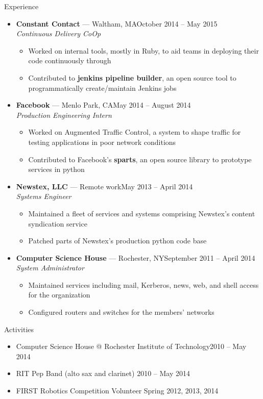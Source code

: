 \documentclass[10pt,oneside]{article}
\newenvironment{ressection}[1]{
	\vspace{3pt}
	{\fontfamily{ppl}\selectfont\Large#1}
	\begin{itemize}
	\vspace{2pt}
}{
	\end{itemize}
}
\newcommand{\resitem}[1]{
	\vspace{-2pt}
	\item \begin{flushleft} #1 \end{flushleft}
}
\newcommand{\ressubitem}[1]{
	\vspace{-1pt}
	\item \begin{flushleft} #1 \end{flushleft}
}
\newcommand{\resbigitem}[3]{
	\vspace{-3pt}
	\item
	\textbf{#1} --- #2 \\
	\textit{#3}
}
\newenvironment{ressubsec}[3]{
	\resbigitem{#1}{#2}{#3}
	\vspace{-1pt}
	\begin{itemize}
}{
	\end{itemize}
}
\begin{document}
\begin{ressection}{Experience}

	\begin{ressubsec}{Constant Contact}{Waltham, MA\hfill October 2014 -- May 2015}{Continuous Delivery CoOp}
		\ressubitem{Worked on internal tools, mostly in Ruby, to aid teams in deploying their code continuously through }
		\ressubitem{Contributed to \textbf{jenkins pipeline builder}, an open source tool to programmatically create/maintain Jenkins jobs}
	\end{ressubsec}
	\begin{ressubsec}{Facebook}{Menlo Park, CA\hfill May 2014 -- August 2014}{Production Engineering Intern}
		\ressubitem{Worked on Augmented Traffic Control, a system to shape traffic for testing applications in poor network conditions}
		\ressubitem{Contributed to Facebook's \textbf{sparts}, an open source library to prototype services in python}
	\end{ressubsec}
	\begin{ressubsec}{Newstex, LLC}{Remote work\hfill May 2013 -- April 2014}{Systems Engineer}
		\ressubitem{Maintained a fleet of services and systems comprising Newstex's content syndication service}
		\ressubitem{Patched parts of Newstex's production python code base}
	\end{ressubsec}
	\begin{ressubsec}{Computer Science House}{Rochester, NY\hfill September 2011 -- April 2014}{System Administrator}
		\ressubitem{Maintained services including mail, Kerberos, news, web, and shell access for the organization}
		\ressubitem{Configured routers and switches for the members' networks}
	\end{ressubsec}

\end{ressection}


\begin{ressection}{Activities}

	\resitem{Computer Science House @ Rochester Institute of Technology\hfill 2010 -- May 2014}
	\resitem{RIT Pep Band (alto sax and clarinet) \hfill 2010 -- May 2014}
	\resitem{FIRST Robotics Competition Volunteer \hfill Spring 2012, 2013, 2014}

\end{ressection}
\end{document}
